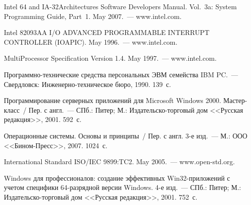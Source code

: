 \begin{multicols}{2}
{{\begin{thebibliography}{99}
Intel 64 and IA-32Architectures Software Developers Manual. Vol.~3a: System Programming Guide,
Part~1. May 2007.~--- {\sf www.intel.com.}

Intel 82093AA I/O ADVANCED PROGRAMMABLE INTERRUPT CONTROLLER (IOAPIC). May
1996.~--- {\sf www.intel.com.}

MultiProcessor Specification Version 1.4. May 1997.~--- {\sf www.intel.com.}


    Программно-тех\-ни\-че\-ские средства персональных ЭВМ семейства IBM PC.~--- Свердловск:
Инженерно-техническое бюро, 1990.  139~с.

Программирование серверных приложений для Microsoft Windows 2000. Мастер-класс~/ Пер. с
англ.~--- СПб.: Питер; М.: Издательско-торговый дом <<Русская редакция>>, 2001.  592~с.

Операционные системы. Основы и принципы~/ Пер. с англ. 3-е изд.~--- М.: ООО
<<Бином-Пресс>>, 2007.  1024~с.

\label{end\stat}

International Standard ISO/IEC 9899:TC2. May 2005.~--- {\sf www.open-std.org.}

    Windows для профессионалов: создание эффективных Win32-приложений с учетом специфики
64-разрядной версии Windows. 4-е изд.~--- СПб.: Питер; М.: Издательско-торговый дом <<Русская
редакция>>, 2001.  752~с.
\end{thebibliography}
}
}
\end{multicols}